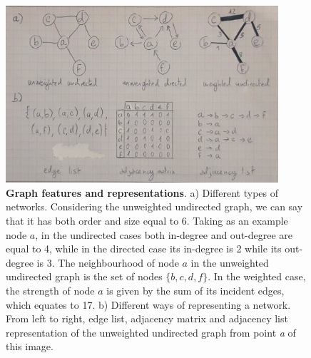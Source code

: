 \begin{figure}[hb]
  \centering
  \includegraphics[width=0.9\textwidth]{networks.jpeg}
  \caption{\textbf{Graph features and representations}. a) Different types of networks. Considering the unweighted undirected graph, we can say that it has both order and size equal to 6. Taking as an example node $a$, in the undirected cases both in-degree and out-degree are equal to 4, while in the directed case its in-degree is 2 while its out-degree is 3. The neighbourhood of node $a$ in the unweighted undirected graph is the set of nodes $\{b,c,d,f\}$. In the weighted case, the strength of node $a$ is given by the sum of its incident edges, which equates to 17. b) Different ways of representing a network. From left to right, edge list, adjacency matrix and adjacency list representation of the unweighted undirected graph from point \emph{a} of this image.}
  \label{fig:networks}
\end{figure}

